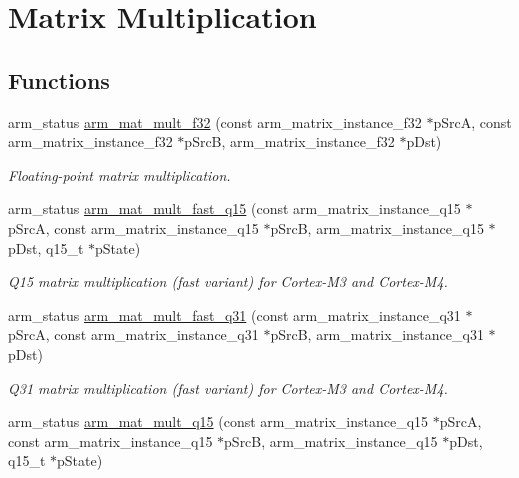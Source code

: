 \hypertarget{group__MatrixMult}{}\section{Matrix Multiplication}
\label{group__MatrixMult}
\subsection*{Functions}
\begin{DoxyCompactItemize}
\item 
arm\+\_\+status \hyperlink{group__MatrixMult_ga917bf0270310c1d3f0eda1fc7c0026a0}{arm\+\_\+mat\+\_\+mult\+\_\+f32} (const arm\+\_\+matrix\+\_\+instance\+\_\+f32 $\ast$p\+SrcA, const arm\+\_\+matrix\+\_\+instance\+\_\+f32 $\ast$p\+SrcB, arm\+\_\+matrix\+\_\+instance\+\_\+f32 $\ast$p\+Dst)
\begin{DoxyCompactList}\small\item\em Floating-\/point matrix multiplication. \end{DoxyCompactList}\item 
arm\+\_\+status \hyperlink{group__MatrixMult_ga08f37d93a5bfef0c5000dc5e0a411f93}{arm\+\_\+mat\+\_\+mult\+\_\+fast\+\_\+q15} (const arm\+\_\+matrix\+\_\+instance\+\_\+q15 $\ast$p\+SrcA, const arm\+\_\+matrix\+\_\+instance\+\_\+q15 $\ast$p\+SrcB, arm\+\_\+matrix\+\_\+instance\+\_\+q15 $\ast$p\+Dst, q15\+\_\+t $\ast$p\+State)
\begin{DoxyCompactList}\small\item\em Q15 matrix multiplication (fast variant) for Cortex-\/\+M3 and Cortex-\/\+M4. \end{DoxyCompactList}\item 
arm\+\_\+status \hyperlink{group__MatrixMult_ga2785e8c1b785348b0c439b56aaf585a3}{arm\+\_\+mat\+\_\+mult\+\_\+fast\+\_\+q31} (const arm\+\_\+matrix\+\_\+instance\+\_\+q31 $\ast$p\+SrcA, const arm\+\_\+matrix\+\_\+instance\+\_\+q31 $\ast$p\+SrcB, arm\+\_\+matrix\+\_\+instance\+\_\+q31 $\ast$p\+Dst)
\begin{DoxyCompactList}\small\item\em Q31 matrix multiplication (fast variant) for Cortex-\/\+M3 and Cortex-\/\+M4. \end{DoxyCompactList}\item 
arm\+\_\+status \hyperlink{group__MatrixMult_ga7521d59196189bb6dde26e8cdfb66e21}{arm\+\_\+mat\+\_\+mult\+\_\+q15} (const arm\+\_\+matrix\+\_\+instance\+\_\+q15 $\ast$p\+SrcA, const arm\+\_\+matrix\+\_\+instance\+\_\+q15 $\ast$p\+SrcB, arm\+\_\+matrix\+\_\+instance\+\_\+q15 $\ast$p\+Dst, q15\+\_\+t $\ast$p\+State)

\end{DoxyCompactItemize}
